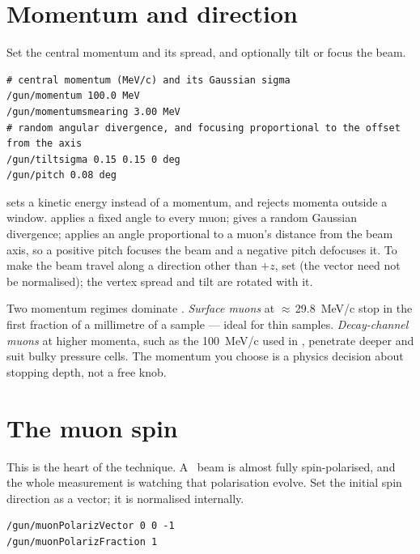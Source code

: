 \section{Momentum and direction}
Set the central momentum and its spread, and optionally tilt or focus the beam.

\begin{lstlisting}[style=mac,caption={Momentum and beam optics}]
# central momentum (MeV/c) and its Gaussian sigma
/gun/momentum 100.0 MeV
/gun/momentumsmearing 3.00 MeV
# random angular divergence, and focusing proportional to the offset from the axis
/gun/tiltsigma 0.15 0.15 0 deg
/gun/pitch 0.08 deg
\end{lstlisting}

 sets a kinetic energy instead of a momentum, and  rejects momenta outside a window.  applies a fixed angle to every muon;  gives a random Gaussian divergence;  applies an angle proportional to a muon's distance from the beam axis, so a positive pitch focuses the beam and a negative pitch defocuses it. To make the beam travel along a direction other than \(+z\), set  (the vector need not be normalised); the vertex spread and tilt are rotated with it.

\begin{physics}
Two momentum regimes dominate \muSR. \emph{Surface muons} at \(\approx\)\,\SI{29.8}{MeV/c} stop in the first fraction of a millimetre of a sample --- ideal for thin samples. \emph{Decay-channel muons} at higher momenta, such as the \SI{100}{MeV/c} used in , penetrate deeper and suit bulky pressure cells. The momentum you choose is a physics decision about stopping depth, not a free knob.
\end{physics}

\section{The muon spin}
This is the heart of the technique. A \muSR\ beam is almost fully spin-polarised, and the whole measurement is watching that polarisation evolve. Set the initial spin direction as a vector; it is normalised internally.

\begin{lstlisting}[style=mac,caption={Spin anti-parallel to a $+z$ beam (the standard \muSR\ set-up)}]
/gun/muonPolarizVector 0 0 -1
/gun/muonPolarizFraction 1
\end{lstlisting}

